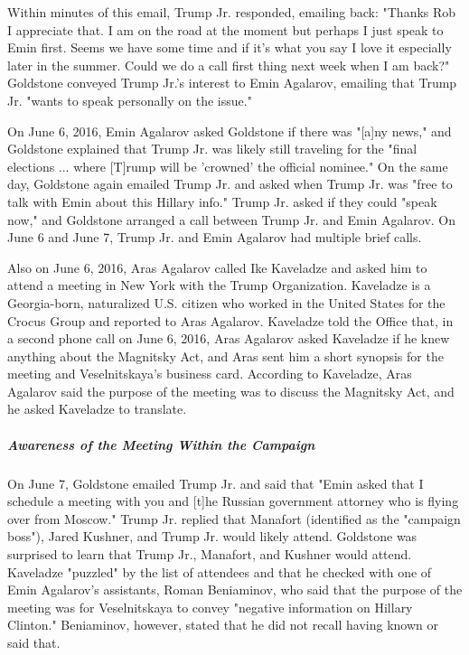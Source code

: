 Within minutes of this email, Trump Jr. responded, emailing back: "Thanks Rob I appreciate that.
I am on the road at the moment but perhaps I just speak to Emin first.
Seems we have some time and if it's what you say I love it especially later in the summer.
Could we do a call first thing next week when I am back?"%
Goldstone conveyed Trump Jr.'s interest to Emin Agalarov, emailing that Trump Jr. "wants to speak personally on the issue."%

On June 6, 2016, Emin Agalarov asked Goldstone if there was "[a]ny news," and Goldstone explained that Trump Jr. was likely still traveling for the "final elections ... where [T]rump will be 'crowned' the official nominee."%
On the same day, Goldstone again emailed Trump Jr. and asked when Trump Jr. was "free to talk with Emin about this Hillary info."%
Trump Jr. asked if they could "speak now," and Goldstone arranged a call between Trump Jr. and Emin Agalarov.%
On June 6 and June 7, Trump Jr. and Emin Agalarov had multiple brief calls.%

Also on June 6, 2016, Aras Agalarov called Ike Kaveladze and asked him to attend a meeting in New York with the Trump Organization.%
Kaveladze is a Georgia-born, naturalized U.S. citizen who worked in the United States for the Crocus Group and reported to Aras Agalarov.%
Kaveladze told the Office that, in a second phone call on June 6, 2016, Aras Agalarov asked Kaveladze if he knew anything about the Magnitsky Act, and Aras sent him a short synopsis for the meeting and Veselnitskaya's business card.
According to Kaveladze, Aras Agalarov said the purpose of the meeting was to discuss the Magnitsky Act, and he asked Kaveladze to translate.%

\subparagraph{Awareness of the Meeting Within the Campaign}

On June 7, Goldstone emailed Trump Jr. and said that "Emin asked that I schedule a meeting with you and [t]he Russian government attorney who is flying over from Moscow."%
Trump Jr. replied that Manafort (identified as the "campaign boss"), Jared Kushner, and Trump Jr. would likely attend.%
Goldstone was surprised to learn that Trump Jr., Manafort, and Kushner would attend.%
Kaveladze 
"puzzled" by the list of attendees and that he checked with one of Emin Agalarov's assistants, Roman Beniaminov, who said that the purpose of the meeting was for Veselnitskaya to convey "negative information on Hillary Clinton."%
Beniaminov, however, stated that he did not recall having known or said that.%

